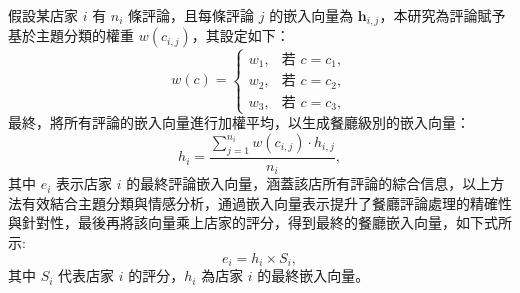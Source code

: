         假設某店家 \(i\) 有 \(n_i\) 條評論，且每條評論 \(j\) 的嵌入向量為 \(\mathbf{h}_{i,j}\)，本研究為評論賦予基於主題分類的權重 \(w(c_{i,j})\)，其設定如下：
        \begin{equation}
            w(c) =
            \begin{cases}
            w_{1}, & \text{若 } c = c_1, \\
            w_{2}, & \text{若 } c = c_2, \\
            w_{3}, & \text{若 } c = c_3,
            \end{cases}
        \end{equation}
        最終，將所有評論的嵌入向量進行加權平均，以生成餐廳級別的嵌入向量：
        \begin{equation}
            h_i = \frac{\sum_{j=1}^{n_i} w(c_{i,j}) \cdot h_{i,j}}{n_i},
        \end{equation}
        其中 $e_i$ 表示店家 \(i\) 的最終評論嵌入向量，涵蓋該店所有評論的綜合信息，以上方法有效結合主題分類與情感分析，通過嵌入向量表示提升了餐廳評論處理的精確性與針對性，最後再將該向量乘上店家的評分，得到最終的餐廳嵌入向量，如下式所示:
        \begin{equation}
            e_i = h_i \times S_i,
        \end{equation}
        其中 \(S_i\) 代表店家 \(i\) 的評分，$h_i$ 為店家 \(i\) 的最終嵌入向量。
        


